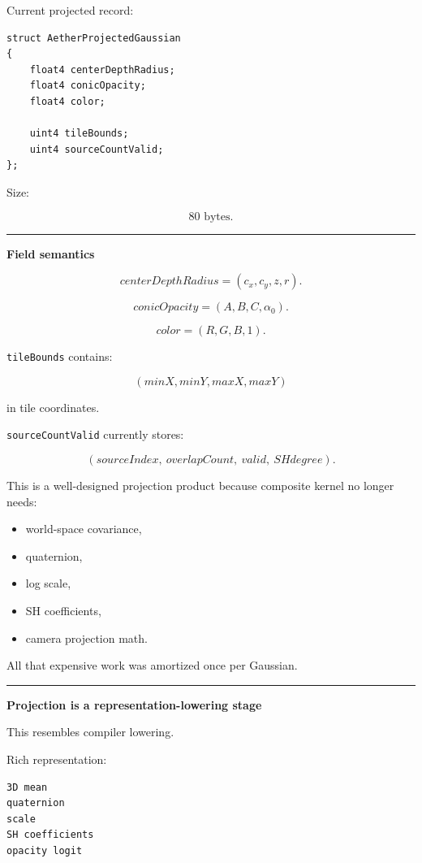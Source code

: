 Current projected record:

\protect{}\label{2lb4al}%
\begin{verbatim}
struct AetherProjectedGaussian
{
    float4 centerDepthRadius;
    float4 conicOpacity;
    float4 color;

    uint4 tileBounds;
    uint4 sourceCountValid;
};
\end{verbatim}

Size:

\[
\boxed{80\text{ bytes}.}
\]

\begin{center}\rule{0.5\linewidth}{0.5pt}\end{center}

\textbf{Field semantics}

\[
centerDepthRadius
=
(c_x,c_y,z,r).
\]

\[
conicOpacity
=
(A,B,C,\alpha_0).
\]

\[
color
=
(R,G,B,1).
\]

\texttt{tileBounds} contains:

\[
(minX,minY,maxX,maxY)
\]

in tile coordinates.

\texttt{sourceCountValid} currently stores:

\[
(sourceIndex,\ overlapCount,\ valid,\ SHdegree).
\]

This is a well-designed projection product because composite kernel no longer needs:

\begin{itemize}
\tightlist
\item
  world-space covariance,
\item
  quaternion,
\item
  log scale,
\item
  SH coefficients,
\item
  camera projection math.
\end{itemize}

All that expensive work was amortized once per Gaussian.

\begin{center}\rule{0.5\linewidth}{0.5pt}\end{center}

\textbf{Projection is a representation-lowering stage}

This resembles compiler lowering.

Rich representation:

\protect{}\label{jyhwui}%
\begin{verbatim}
3D mean
quaternion
scale
SH coefficients
opacity logit
\end{verbatim}

